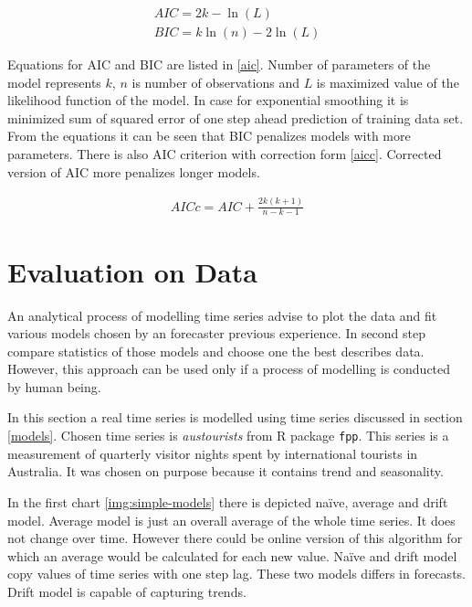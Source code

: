     \begin{eqnarray} \label{aic}
        AIC = 2 k - \ln(L) \\ \nonumber
        BIC = k \ln(n) - 2 \ln(L)
    \end{eqnarray}

    Equations for AIC and BIC are listed in \ref{aic}. Number of parameters of the model represents $k$, $n$ is number
    of observations and $L$ is maximized value of the likelihood function of the model. In case for exponential
    smoothing it is minimized sum of squared error of one step ahead prediction of training data set. From the
    equations it can be seen that BIC penalizes models with more parameters. There is also AIC criterion with
    correction form \ref{aicc}. Corrected version of AIC more penalizes longer models.

    \begin{eqnarray} \label{aicc}
        AICc = AIC + \frac{2k(k+1)}{n-k-1}
    \end{eqnarray}

    \section{Evaluation on Data}
    An analytical process of modelling time series advise to plot the data and fit various models chosen by an
    forecaster previous experience. In second step compare statistics of those models and choose one the best describes
    data. However, this approach can be used only if a process of modelling is conducted by human being.

    In this section a real time series is modelled using time series discussed in section \ref{models}.
    Chosen time series is \emph{austourists} from R package \texttt{fpp}. This series is a measurement of quarterly
    visitor nights spent by international tourists in Australia. It was chosen on purpose because it
    contains trend and seasonality.

    In the first chart \ref{img:simple-models} there is depicted na\"{i}ve, average and drift model. Average model is
    just an overall average of the whole time series. It does not change over time. However there could be online
    version of this algorithm for which an average would be calculated for each new value. Na\"{i}ve and drift model
    copy values of time series with one step lag. These two models differs in forecasts. Drift model is capable of
    capturing trends.

